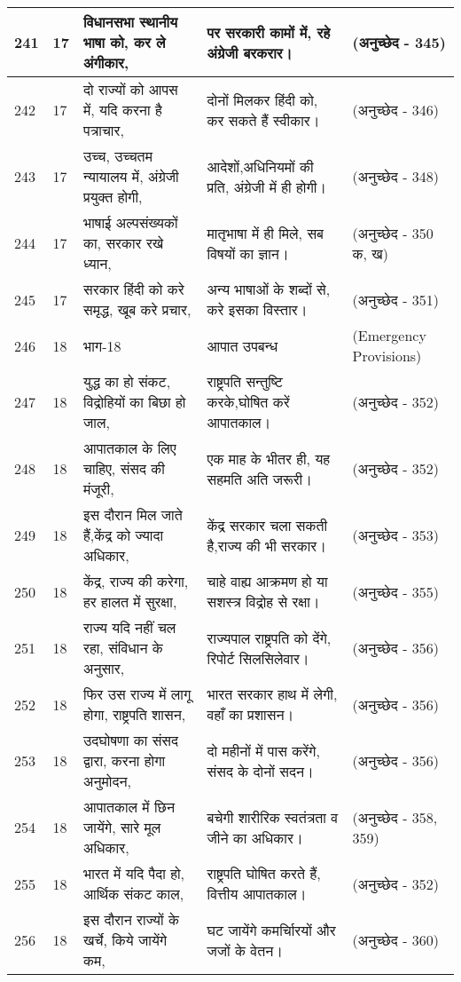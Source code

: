 \begin{longtable}{|l|l|l|l|l|}
241 & 17 & विधानसभा स्थानीय भाषा को, कर ले अंगीकार, & पर सरकारी कामों में, रहे अंग्रेजी बरकरार। & (अनुच्छेद - 345) \\ \hline 
242 & 17 & दो राज्यों को आपस में, यदि करना है पत्राचार, & दोनों मिलकर हिंदी को, कर सकते हैं स्वीकार। & (अनुच्छेद - 346) \\ \hline 
243 & 17 & उच्च, उच्चतम न्यायालय में, अंग्रेजी प्रयुक्त होगी, & आदेशों,अधिनियमों की प्रति, अंग्रेजी में ही होगी। & (अनुच्छेद - 348) \\ \hline 
244 & 17 & भाषाई अल्पसंख्यकों का, सरकार रखे ध्यान, & मातृभाषा में ही मिले, सब विषयों का ज्ञान। & (अनुच्छेद - 350 क, ख) \\ \hline 
245 & 17 & सरकार हिंदी को करे समृद्ध, खूब करे प्रचार, & अन्य भाषाओं के शब्दों से, करे इसका विस्तार। & (अनुच्छेद - 351) \\ \hline 
246 & 18 & भाग-18 & आपात उपबन्ध & (Emergency Provisions) \\ \hline 
247 & 18 & युद्ध का हो संकट, विद्रोहियों का बिछा हो जाल, & राष्ट्रपति सन्तुष्टि करके,घोषित करें आपातकाल। & (अनुच्छेद - 352) \\ \hline 
248 & 18 & आपातकाल के लिए चाहिए, संसद की मंजूरी, & एक माह के भीतर ही, यह सहमति अति जरूरी। & (अनुच्छेद - 352) \\ \hline 
249 & 18 & इस दौरान मिल जाते हैं,केंद्र को ज्यादा अधिकार, & केंद्र सरकार चला सकती है,राज्य की भी सरकार। & (अनुच्छेद - 353) \\ \hline 
250 & 18 & केंद्र, राज्य की करेगा, हर हालत में सुरक्षा, & चाहे वाह्य आक्रमण हो या सशस्त्र विद्रोह से रक्षा। & (अनुच्छेद - 355) \\ \hline 
251 & 18 & राज्य यदि नहीं चल रहा, संविधान के अनुसार, & राज्यपाल राष्ट्रपति को देंगे, रिपोर्ट सिलसिलेवार। & (अनुच्छेद - 356) \\ \hline 
252 & 18 & फिर उस राज्य में लागू होगा, राष्ट्रपति शासन, & भारत सरकार हाथ में लेगी, वहाँ का प्रशासन। & (अनुच्छेद - 356) \\ \hline 
253 & 18 & उदघोषणा का संसद द्वारा, करना होगा अनुमोदन, & दो महीनों में पास करेंगे, संसद के दोनों सदन। & (अनुच्छेद - 356) \\ \hline 
254 & 18 & आपातकाल में छिन जायेंगे, सारे मूल अधिकार, & बचेगी शारीरिक स्वतंत्रता व जीने का अधिकार। & (अनुच्छेद - 358, 359) \\ \hline 
255 & 18 & भारत में यदि पैदा हो, आर्थिक संकट काल, & राष्ट्रपति घोषित करते हैं, वित्तीय आपातकाल। & (अनुच्छेद - 352) \\ \hline 
256 & 18 & इस दौरान राज्यों के खर्चे, किये जायेंगे कम, & घट जायेंगे कमर्चािरयों और जजों के वेतन। & (अनुच्छेद - 360) \\ \hline 

\end{longtable}
